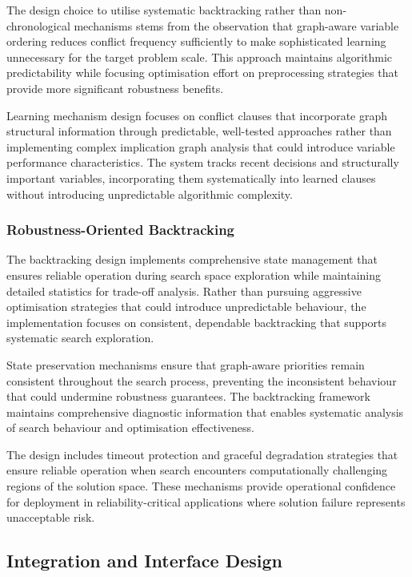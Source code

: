 The design choice to utilise systematic backtracking rather than non-chronological mechanisms stems from the observation that graph-aware variable ordering reduces conflict frequency sufficiently to make sophisticated learning unnecessary for the target problem scale. This approach maintains algorithmic predictability while focusing optimisation effort on preprocessing strategies that provide more significant robustness benefits.

Learning mechanism design focuses on conflict clauses that incorporate graph structural information through predictable, well-tested approaches rather than implementing complex implication graph analysis that could introduce variable performance characteristics. The system tracks recent decisions and structurally important variables, incorporating them systematically into learned clauses without introducing unpredictable algorithmic complexity.

\subsubsection{Robustness-Oriented Backtracking}

The backtracking design implements comprehensive state management that ensures reliable operation during search space exploration while maintaining detailed statistics for trade-off analysis. Rather than pursuing aggressive optimisation strategies that could introduce unpredictable behaviour, the implementation focuses on consistent, dependable backtracking that supports systematic search exploration.

State preservation mechanisms ensure that graph-aware priorities remain consistent throughout the search process, preventing the inconsistent behaviour that could undermine robustness guarantees. The backtracking framework maintains comprehensive diagnostic information that enables systematic analysis of search behaviour and optimisation effectiveness.

The design includes timeout protection and graceful degradation strategies that ensure reliable operation when search encounters computationally challenging regions of the solution space. These mechanisms provide operational confidence for deployment in reliability-critical applications where solution failure represents unacceptable risk.

\subsection{Integration and Interface Design}

